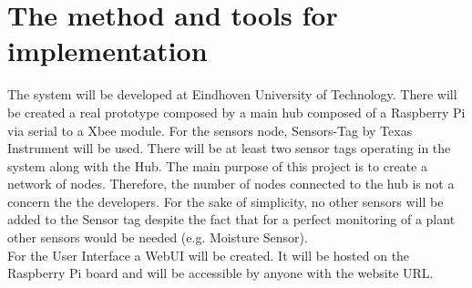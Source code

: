 \section{The method and tools for implementation}
The system will be developed at Eindhoven University of Technology. There will be created a real prototype composed by a main hub composed of a Raspberry Pi via serial to a Xbee module. For the sensors node, Sensors-Tag by Texas Instrument will be used. There will be at least two sensor tags operating in the system along with the Hub. The main purpose of this project is to create a network of nodes. Therefore, the number of nodes connected to the hub is not a concern the the developers. For the sake of simplicity, no other sensors will be added to the Sensor tag despite the fact that for a perfect monitoring of a plant other sensors would be needed (e.g. Moisture Sensor).\\
For the User Interface a WebUI will be created. It will be hosted on the Raspberry Pi board and will be accessible by anyone with the website URL.